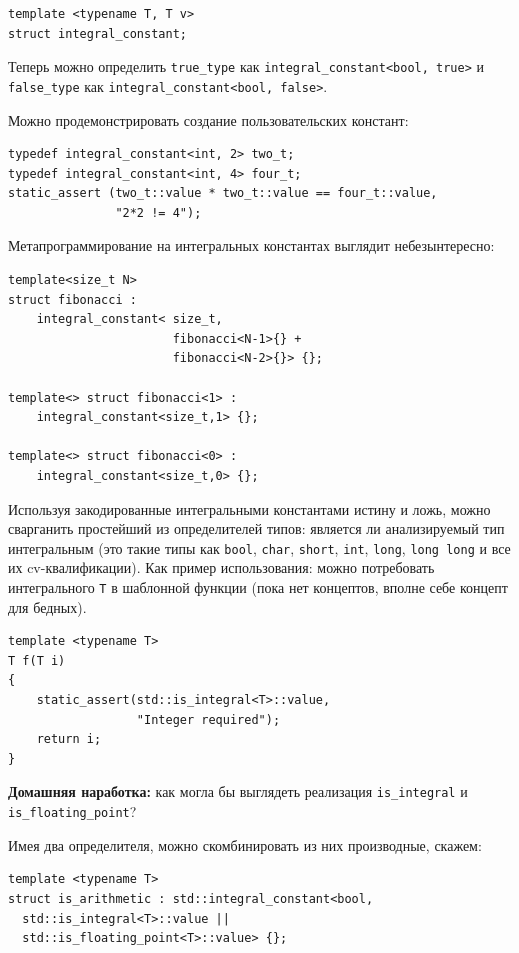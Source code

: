 \documentclass[a4paper,12pt,oneside]{article}
\begin{document}
\begin{lstlisting}
template <typename T, T v>
struct integral_constant;
\end{lstlisting}

Теперь можно определить \lstinline!true_type! как \lstinline!integral_constant<bool, true>! и \lstinline!false_type! как \lstinline!integral_constant<bool, false>!.

Можно продемонстрировать создание пользовательских констант:

\begin{lstlisting}
typedef integral_constant<int, 2> two_t;
typedef integral_constant<int, 4> four_t;
static_assert (two_t::value * two_t::value == four_t::value, 
               "2*2 != 4");
\end{lstlisting}

Метапрограммирование на интегральных константах выглядит небезынтересно:

\begin{lstlisting}
template<size_t N>
struct fibonacci : 
    integral_constant< size_t, 
                       fibonacci<N-1>{} + 
                       fibonacci<N-2>{}> {};

template<> struct fibonacci<1> : 
    integral_constant<size_t,1> {};

template<> struct fibonacci<0> : 
    integral_constant<size_t,0> {};
\end{lstlisting}

Используя закодированные интегральными константами истину и ложь, можно сварганить простейший из определителей типов: является ли анализируемый тип интегральным (это такие типы как \lstinline!bool!, \lstinline!char!, \lstinline!short!, \lstinline!int!, \lstinline!long!, \lstinline!long long! и все их cv-квалификации). Как пример использования: можно потребовать интегрального \lstinline!T! в шаблонной функции (пока нет концептов, вполне себе концепт для бедных).

\begin{lstlisting}
template <typename T>
T f(T i)
{
    static_assert(std::is_integral<T>::value, 
                  "Integer required");
    return i;
}
\end{lstlisting}

\textbf{Домашняя наработка:} как могла бы выглядеть реализация \lstinline!is_integral! и \lstinline!is_floating_point!?

Имея два определителя, можно скомбинировать из них производные, скажем:

\begin{lstlisting}
template <typename T>
struct is_arithmetic : std::integral_constant<bool,
  std::is_integral<T>::value ||
  std::is_floating_point<T>::value> {};
\end{lstlisting}
\end{document}

